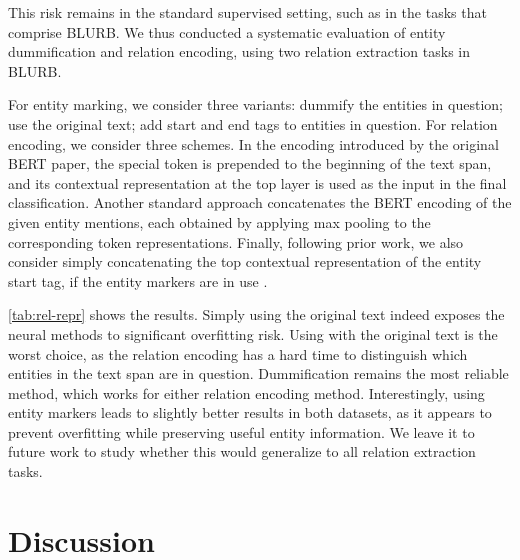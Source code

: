 \documentclass[acmlarge,screen,nonacm]{acmart}
\begin{document}
This risk remains in the standard supervised setting, such as in the tasks that comprise BLURB. 
We thus conducted a systematic evaluation of entity dummification and relation encoding, using two relation extraction tasks in BLURB.

For entity marking, we consider three variants: dummify the entities in question; use the original text; add start and end tags to entities in question.
For relation encoding, we consider three schemes. In the  encoding introduced by the original BERT paper, the special token  is prepended to the beginning of the text span, and its contextual representation at the top layer is used as the input in the final classification. Another standard approach concatenates the BERT encoding of the given entity mentions, each obtained by applying max pooling to the corresponding token representations. 
Finally, following prior work, we also consider simply concatenating the top contextual representation of the entity start tag, if the entity markers are in use \cite{soares2019matching}. 

\autoref{tab:rel-repr} shows the results. Simply using the original text indeed exposes the neural methods to significant overfitting risk. Using  with the original text is the worst choice, as the relation encoding has a hard time to distinguish which entities in the text span are in question. Dummification remains the most reliable method, which works for either relation encoding method. Interestingly, using entity markers leads to slightly better results in both datasets, as it appears to prevent overfitting while preserving useful entity information. We leave it to future work to study whether this would generalize to all relation extraction tasks.
 \section{Discussion}
\label{sec:discussion}
\end{document}
